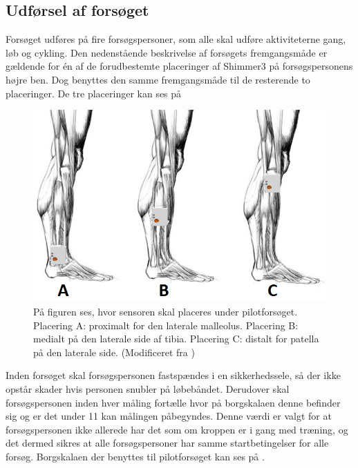 \subsection{Udførsel af forsøget}
Forsøget udføres på fire forsøgspersoner, som alle skal udføre aktiviteterne gang, løb og cykling. Den nedenstående beskrivelse af forsøgets fremgangsmåde er gældende for én af de forudbestemte placeringer af Shimmer3 på forsøgspersonens højre ben. Dog benyttes den samme fremgangsmåde til de resterende to placeringer. De tre placeringer kan ses på 

\begin{figure}[H]
	\centering
	\includegraphics[scale=0.6]{figures/qBilag/Sensor_placering2.png}
	\caption{På figuren ses, hvor sensoren skal placeres under pilotforsøget. Placering A: proximalt for den laterale malleolus. Placering B: medialt på den laterale side af tibia. Placering C: distalt for patella på den laterale side. (Modificeret fra \cite{Perna2016,Shimmer2016})}
	\label{fig:sensor_placering}
\end{figure}

Inden forsøget skal forsøgspersonen fastspændes i en sikkerhedssele, så der ikke opstår skader hvis personen snubler på løbebåndet. Derudover skal forsøgspersonen inden hver måling fortælle hvor på borgskalaen denne befinder sig og er det under 11 kan målingen påbegyndes. Denne værdi er valgt for at forsøgspersonen ikke allerede har det som om kroppen er i gang med træning, og det dermed sikres at alle forsøgspersoner har samme startbetingelser for alle forsøg. Borgskalaen der benyttes til pilotforsøget kan ses på . 

